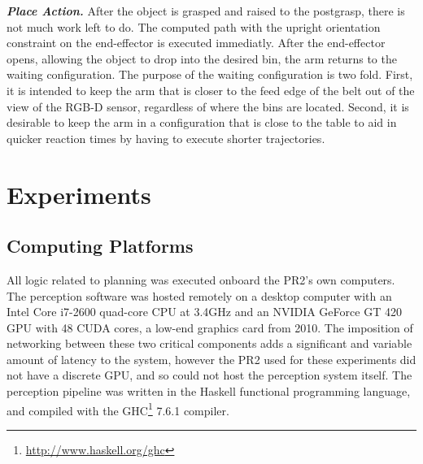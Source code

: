 \documentclass[letterpaper, 10 pt, conference]{ieeeconf}  %
\begin{document}
\textit{\textbf{Place Action.}}
After the object is grasped and raised to the postgrasp, there is not much work left to do. The computed path with the upright orientation constraint on the end-effector is executed immediatly. After the end-effector opens, allowing the object to drop into the desired bin, the arm returns to the waiting configuration. The purpose of the waiting configuration is two fold. First, it is intended to keep the arm that is closer to the feed edge of the belt out of the view of the RGB-D sensor, regardless of where the bins are located. Second, it is desirable to keep the arm in a configuration that is close to the table to aid in quicker reaction times by having to execute shorter trajectories.




\section{Experiments}


\subsection{Computing Platforms}
All logic related to planning was executed onboard the PR2's own
computers. The perception software was hosted remotely on a desktop
computer with an Intel Core i7-2600 quad-core CPU at 3.4GHz and an
NVIDIA GeForce GT 420 GPU with 48 CUDA cores, a low-end graphics card
from 2010. The imposition of networking between these two critical
components adds a significant and variable amount of latency to the
system, however the PR2 used for these experiments did not have a
discrete GPU, and so could not host the perception system itself. The
perception pipeline was written in the Haskell functional programming
language, and compiled with the
GHC\footnote{\url{http://www.haskell.org/ghc}} 7.6.1 compiler.
\end{document}
